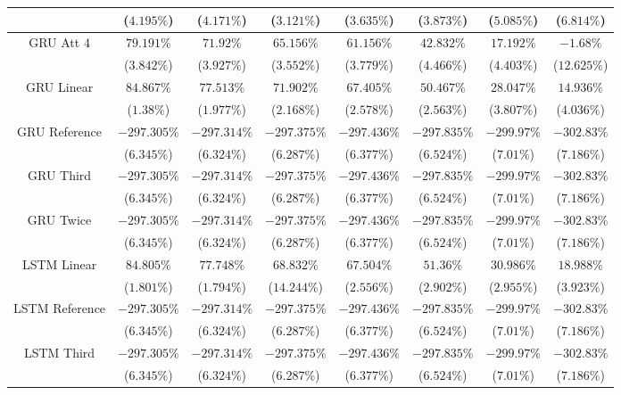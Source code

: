 \begin{table}[!ht]
{\begin{tabular}{|c|c|c|c|c|c|c|c|}
			 & ($4.195\%$) & ($4.171\%$) & ($3.121\%$) & ($3.635\%$) & ($3.873\%$) & ($5.085\%$) & ($6.814\%$) \\ \hline
			\multirow{2}{*}{GRU Att 4} & $79.191\%$ & $71.92\%$ & $65.156\%$ & $61.156\%$ & $42.832\%$ & $17.192\%$ & $-1.68\%$ \\
			 & ($3.842\%$) & ($3.927\%$) & ($3.552\%$) & ($3.779\%$) & ($4.466\%$) & ($4.403\%$) & ($12.625\%$) \\ \hline
			\multirow{2}{*}{GRU Linear} & $84.867\%$ & $77.513\%$ & $71.902\%$ & $67.405\%$ & $50.467\%$ & $28.047\%$ & $14.936\%$ \\
			 & ($1.38\%$) & ($1.977\%$) & ($2.168\%$) & ($2.578\%$) & ($2.563\%$) & ($3.807\%$) & ($4.036\%$) \\ \hline
			\multirow{2}{*}{GRU Reference} & $-297.305\%$ & $-297.314\%$ & $-297.375\%$ & $-297.436\%$ & $-297.835\%$ & $-299.97\%$ & $-302.83\%$ \\
			 & ($6.345\%$) & ($6.324\%$) & ($6.287\%$) & ($6.377\%$) & ($6.524\%$) & ($7.01\%$) & ($7.186\%$) \\ \hline
			\multirow{2}{*}{GRU Third} & $-297.305\%$ & $-297.314\%$ & $-297.375\%$ & $-297.436\%$ & $-297.835\%$ & $-299.97\%$ & $-302.83\%$ \\
			 & ($6.345\%$) & ($6.324\%$) & ($6.287\%$) & ($6.377\%$) & ($6.524\%$) & ($7.01\%$) & ($7.186\%$) \\ \hline
			\multirow{2}{*}{GRU Twice} & $-297.305\%$ & $-297.314\%$ & $-297.375\%$ & $-297.436\%$ & $-297.835\%$ & $-299.97\%$ & $-302.83\%$ \\
			 & ($6.345\%$) & ($6.324\%$) & ($6.287\%$) & ($6.377\%$) & ($6.524\%$) & ($7.01\%$) & ($7.186\%$) \\ \hline
			\multirow{2}{*}{LSTM Linear} & $84.805\%$ & $77.748\%$ & $68.832\%$ & $67.504\%$ & $51.36\%$ & $30.986\%$ & $18.988\%$ \\
			 & ($1.801\%$) & ($1.794\%$) & ($14.244\%$) & ($2.556\%$) & ($2.902\%$) & ($2.955\%$) & ($3.923\%$) \\ \hline
			\multirow{2}{*}{LSTM Reference} & $-297.305\%$ & $-297.314\%$ & $-297.375\%$ & $-297.436\%$ & $-297.835\%$ & $-299.97\%$ & $-302.83\%$ \\
			 & ($6.345\%$) & ($6.324\%$) & ($6.287\%$) & ($6.377\%$) & ($6.524\%$) & ($7.01\%$) & ($7.186\%$) \\ \hline
			\multirow{2}{*}{LSTM Third} & $-297.305\%$ & $-297.314\%$ & $-297.375\%$ & $-297.436\%$ & $-297.835\%$ & $-299.97\%$ & $-302.83\%$ \\
			 & ($6.345\%$) & ($6.324\%$) & ($6.287\%$) & ($6.377\%$) & ($6.524\%$) & ($7.01\%$) & ($7.186\%$) \\ \hline

\end{tabular}}
\end{table}
